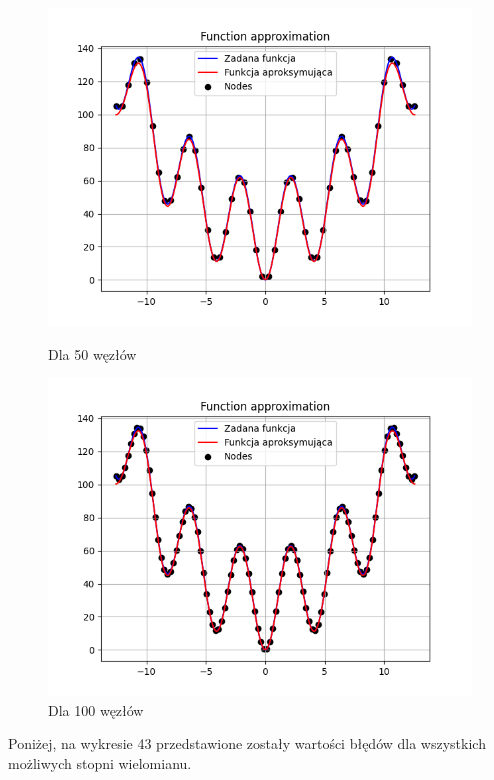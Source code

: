 \documentclass{article}
\begin{document}
\begin{figure}[H]
\begin{minipage}[b]{0.49\textwidth}
    \begin{minipage}[b]{\textwidth}
      \includegraphics[width=\textwidth]{img41.png}
      \caption{Dla 50 węzłów}
    \end{minipage}
    \vspace*{\fill}
    \begin{minipage}[b]{\textwidth}
      \includegraphics[width=\textwidth]{img42.png}
      \caption{Dla 100 węzłów}
    \end{minipage}
  \end{minipage}
\end{figure}

\noindent
Poniżej, na wykresie 43 przedstawione zostały wartości błędów dla wszystkich możliwych stopni wielomianu.
\end{document}
